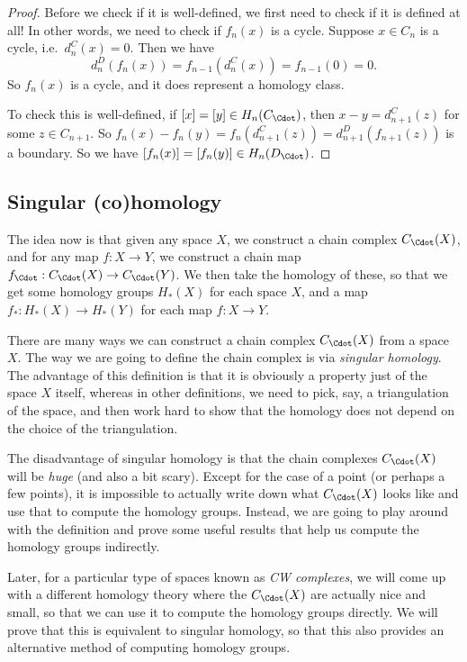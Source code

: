 \documentclass[a4paper]{article}
\theoremstyle{definition}
\begin{document}
\begin{proof}
  Before we check if it is well-defined, we first need to check if it is defined at all! In other words, we need to check if $f_n(x)$ is a cycle. Suppose $x \in C_n$ is a cycle, i.e.\ $d_n^C(x) = 0$. Then we have
  \[
    d_n^D(f_n(x)) = f_{n - 1}(d_n^C(x)) = f_{n - 1}(0) = 0.
  \]
  So $f_n(x)$ is a cycle, and it does represent a homology class.

  To check this is well-defined, if $[x] = [y] \in H_n(C_{\Cdot})$, then $x - y = d_{n + 1}^C(z)$ for some $z\in C_{n + 1}$. So $f_n(x) - f_n(y) = f_n (d_{n + 1}^C(z)) = d_{n + 1}^D (f_{n + 1}(z))$ is a boundary. So we have $[f_n(x)] = [f_n(y)] \in H_n(D_{\Cdot})$.
\end{proof}

\subsection{Singular (co)homology}
The idea now is that given any space $X$, we construct a chain complex $C_\Cdot(X)$, and for any map $f: X \to Y$, we construct a chain map $f_\Cdot: C_\Cdot(X) \to C_\Cdot(Y)$. We then take the homology of these, so that we get some homology groups $H_*(X)$ for each space $X$, and a map $f_*: H_*(X) \to H_*(Y)$ for each map $f: X \to Y$.

There are many ways we can construct a chain complex $C_\Cdot(X)$ from a space $X$. The way we are going to define the chain complex is via \emph{singular homology}. The advantage of this definition is that it is obviously a property just of the space $X$ itself, whereas in other definitions, we need to pick, say, a triangulation of the space, and then work hard to show that the homology does not depend on the choice of the triangulation.

The disadvantage of singular homology is that the chain complexes $C_\Cdot(X)$ will be \emph{huge} (and also a bit scary). Except for the case of a point (or perhaps a few points), it is impossible to actually write down what $C_\Cdot(X)$ looks like and use that to compute the homology groups. Instead, we are going to play around with the definition and prove some useful results that help us compute the homology groups indirectly.

Later, for a particular type of spaces known as \emph{CW complexes}, we will come up with a different homology theory where the $C_{\Cdot}(X)$ are actually nice and small, so that we can use it to compute the homology groups directly. We will prove that this is equivalent to singular homology, so that this also provides an alternative method of computing homology groups.
\end{document}
